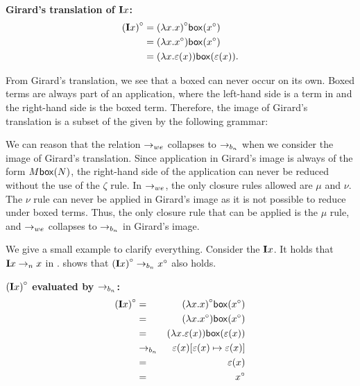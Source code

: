 \begin{example}
  \label{ex:girard-translation}
  \textbf{Girard's translation of \boldmath${\mathbf{I} x}$:}
  \begin{align*}
 {(\mathbf{I}x)}^\circ &= {(\lambda {x}.{x})}^\circ \mathsf{box}({{x}^\circ}) \\
                     &= (\lambda {x}.{{x}^\circ}) \mathsf{box}({{x}^\circ}) \\
                     &= (\lambda {x}.{\varepsilon(x)}) \mathsf{box}({\varepsilon(x)}).
  \end{align*}
\end{example}

From Girard's translation, we see that a boxed \lterm can never occur on its own.
Boxed terms are always part of an application, where the left-hand side is a term in \lab and the right-hand side is the boxed term.
Therefore, the image of Girard's translation is a subset of the \lab given by the following grammar:

\vspace{10pt}
\begin{grammar}{
 }
\end{grammar}
\vspace{10pt}

We can reason that the relation $\to_{we}$ collapses to $\to_{b_n}$ when we consider the image of Girard's translation.
Since application in Girard's image is always of the form $M \mathsf{box}({N})$, the right-hand side of the application can never be reduced without the use of the $\zeta$ rule.
In $\to_{we}$, the only closure rules allowed are $\mu$ and $\nu$. 
The $\nu$ rule can never be applied in Girard's image as it is not possible to reduce under boxed terms.
Thus, the only closure rule that can be applied is the $\mu$ rule, and $\to_{we}$ collapses to $\to_{b_n}$ in Girard's image.

We give a small example to clarify everything. Consider the \lterm $\mathbf{I} x$. It holds that $\mathbf{I} x \to_n x$ in \lan. 
 shows that ${(\mathbf{I} x)}^\circ \to_{b_n} {x}^\circ$ also holds.

\begin{example}
  \label{ex:girard-translation-bn}
  \textbf{\boldmath${{(\mathbf{I} x)}^\circ}$ evaluated by $\to_{b_n}$:}
  \begin{eqnarray*}
 {(\mathbf{I}x)}^\circ &=& {(\lambda {x}.{x})}^\circ \mathsf{box}({{x}^\circ}) \\
    &=& (\lambda {x}.{{x}^\circ}) \mathsf{box}({{x}^\circ}) \\
    &=& (\lambda {x}.{\varepsilon(x)}) \mathsf{box}({\varepsilon(x)}) \\
    &\to_{b_n}& \varepsilon(x) [{\varepsilon(x)}\mapsto{\varepsilon(x)}] \\
    &=& \varepsilon(x) \\
    &=& {x}^\circ
  \end{eqnarray*}
\end{example}  

